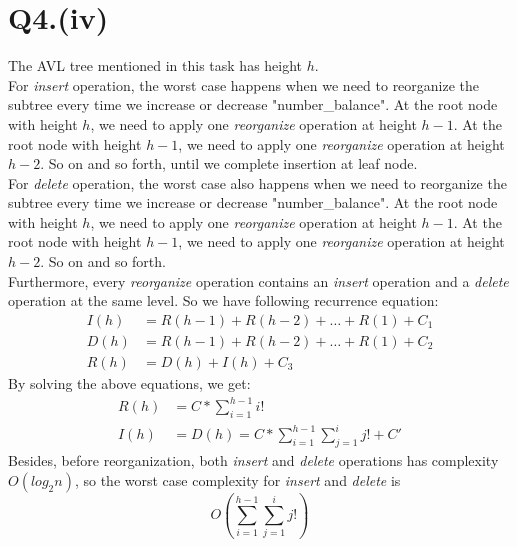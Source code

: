 \documentclass{article}
\begin{document}
\section*{Q4.(iv)}
    The AVL tree mentioned in this task has height $h$.\\
    For \emph{insert} operation, the worst case happens when we need to reorganize the subtree every time we increase or decrease "number\_balance".
    At the root node with height $h$, we need to apply one \emph{reorganize} operation at height $h-1$. At the root node with height $h-1$, we need to 
    apply one \emph{reorganize} operation at height $h-2$. So on and so forth, until we complete insertion at leaf node.\\
    For \emph{delete} operation, the worst case also happens when we need to reorganize the subtree every time we increase or decrease 
    "number\_balance". At the root node with height $h$, we need to apply one \emph{reorganize} operation at height $h-1$. At the root node with height 
    $h-1$, we need to apply one \emph{reorganize} operation at height $h-2$. So on and so forth.\\
    Furthermore, every \emph{reorganize} operation contains an \emph{insert} operation and a \emph{delete} operation at the same level. 
    So we have following recurrence equation:
\begin{align*}
    I(h) &= R(h-1) + R(h-2) + \ldots + R(1) + C_{1}\\
    D(h) &= R(h-1) + R(h-2) + \ldots + R(1) + C_{2}\\
    R(h) &= D(h) + I(h) + C_{3}
\end{align*}
    By solving the above equations, we get:
\begin{align*}
    R(h) &= C * \sum_{i = 1}^{h-1} i!\\
    I(h) &= D(h) = C * \sum_{i = 1}^{h-1} \sum_{j = 1}^{i} j! + C'
\end{align*}
    Besides, before reorganization, both \emph{insert} and \emph{delete} operations has complexity $O(log_{2}n)$, so the worst case complexity for 
    \emph{insert} and \emph{delete} is 
$$O(\sum_{i = 1}^{h-1} \sum_{j = 1}^{i} j!)$$
\end{document}
